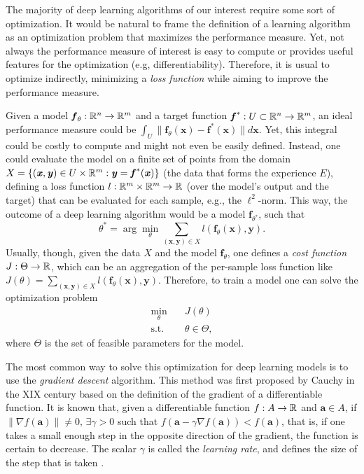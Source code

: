 The majority of deep learning algorithms of our interest require some sort of optimization.
It would be natural to frame the definition of a learning algorithm as an optimization problem that maximizes the performance measure.
Yet, not always the performance measure of interest is easy to compute or provides useful features for the optimization (e.g, differentiability).
Therefore, it is usual to optimize indirectly, minimizing a \textit{loss function} while aiming to improve the performance measure.

Given a model $\textbf{\textit{f}}_\theta:\mathbb{R}^n\to\mathbb{R}^m$ and a target function $\textbf{\textit{f}}^*:U\subset\mathbb{R}^n\to\mathbb{R}^m$, an ideal performance measure could be $\int_U \|\bm{f}_\theta(\bm{x}) - \bm{f}^*(\bm{x})\|d\bm{x}$.
Yet, this integral could be costly to compute and might not even be easily defined.
Instead, one could evaluate the model on a finite set of points from the domain $X=\{(\textbf{\textit{x}},\textbf{\textit{y}})\in U\times\mathbb{R}^m : \textbf{\textit{y}}=\textbf{\textit{f}}^*(\textbf{\textit{x}})\}$ (the data that forms the experience $E$), defining a loss function $l:\mathbb{R}^m\times\mathbb{R}^m\to\mathbb{R}$ (over the model's output and the target) that can be evaluated for each sample, e.g., the $\ell^2$-norm.
This way, the outcome of a deep learning algorithm would be a model $\bm{f}_{\theta^*}$, such that \[
\theta^* = \arg\min_\theta \sum_{(\bm{x},\bm{y})\in X} l(\bm{f}_\theta(\bm{x}), \bm{y})
.\] Usually, though, given the data $X$ and the model $\bm{f}_\theta$, one defines a \emph{cost function} $J: \Theta\to\mathbb{R}$, which can be an aggregation of the per-sample loss function like $J\left( \theta \right) = \sum_{(\bm{x},\bm{y})\in X} l(\bm{f}_\theta(\bm{x}), \bm{y})$.
Therefore, to train a model one can solve the optimization problem
\begin{align*}
    \min_\theta \quad & J\left( \theta \right)  \\
    \text{s.t.} \quad & \theta \in \Theta
,\end{align*}
where $\Theta$ is the set of feasible parameters for the model.

The most common way to solve this optimization for deep learning models is to use the \textit{gradient descent} algorithm.
This method was first proposed by Cauchy in the XIX century \cite{lemarechal_cauchy_2012} based on the definition of the gradient of a differentiable function.
It is known that, given a differentiable function $f:A\to\mathbb{R}$ and $\bm{a} \in A$, if $\| \nabla f(\bm{a}) \| \neq 0,\,\exists \gamma > 0$ such that $f(\bm{a} - \gamma \nabla f(\bm{a})) < f(\bm{a})$, that is, if one takes a small enough step in the opposite direction of the gradient, the function is certain to decrease.
The scalar $\gamma$ is called the \textit{learning rate}, and defines the size of the step that is taken \cite{goodfellow_deep_2016}.

